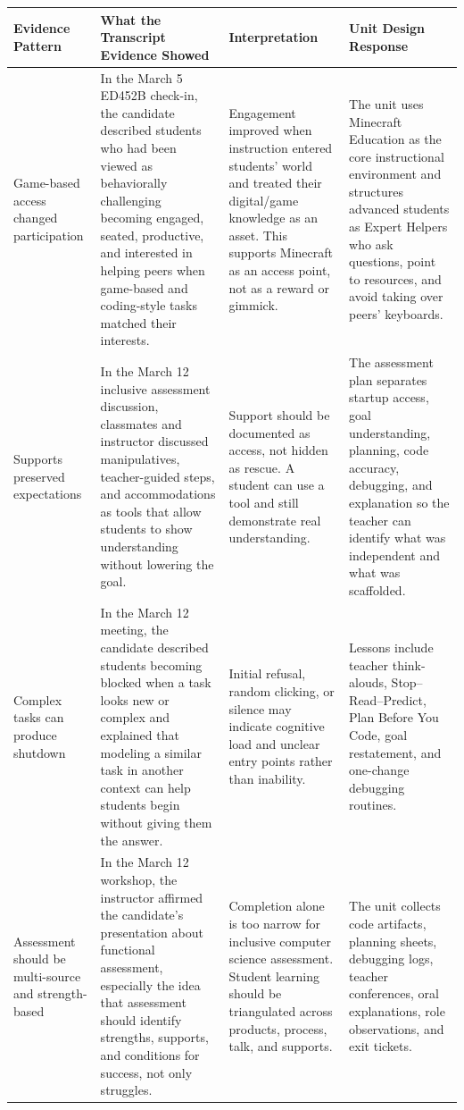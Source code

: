 \documentclass[12pt]{article}
\begin{document}
\begin{xltabular}{\textwidth}{|P{1.45in}|P{1.9in}|P{1.85in}|L|}
\hline
{}\color{white}\bfseries Evidence Pattern & \color{white}\bfseries What the Transcript Evidence Showed & \color{white}\bfseries Interpretation & \color{white}\bfseries Unit Design Response \\
\hline
Game-based access changed participation & In the March 5 ED452B check-in, the candidate described students who had been viewed as behaviorally challenging becoming engaged, seated, productive, and interested in helping peers when game-based and coding-style tasks matched their interests. & Engagement improved when instruction entered students' world and treated their digital/game knowledge as an asset. This supports Minecraft as an access point, not as a reward or gimmick. & The unit uses Minecraft Education as the core instructional environment and structures advanced students as Expert Helpers who ask questions, point to resources, and avoid taking over peers' keyboards. \\
\hline
{} Supports preserved expectations & In the March 12 inclusive assessment discussion, classmates and instructor discussed manipulatives, teacher-guided steps, and accommodations as tools that allow students to show understanding without lowering the goal. & Support should be documented as access, not hidden as rescue. A student can use a tool and still demonstrate real understanding. & The assessment plan separates startup access, goal understanding, planning, code accuracy, debugging, and explanation so the teacher can identify what was independent and what was scaffolded. \\
\hline
Complex tasks can produce shutdown & In the March 12 meeting, the candidate described students becoming blocked when a task looks new or complex and explained that modeling a similar task in another context can help students begin without giving them the answer. & Initial refusal, random clicking, or silence may indicate cognitive load and unclear entry points rather than inability. & Lessons include teacher think-alouds, Stop--Read--Predict, Plan Before You Code, goal restatement, and one-change debugging routines. \\
\hline
{} Assessment should be multi-source and strength-based & In the March 12 workshop, the instructor affirmed the candidate's presentation about functional assessment, especially the idea that assessment should identify strengths, supports, and conditions for success, not only struggles. & Completion alone is too narrow for inclusive computer science assessment. Student learning should be triangulated across products, process, talk, and supports. & The unit collects code artifacts, planning sheets, debugging logs, teacher conferences, oral explanations, role observations, and exit tickets. \\

\end{xltabular}
\end{document}
